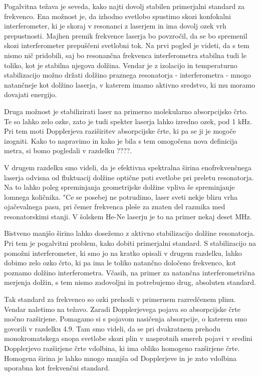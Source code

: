 Pogalvitna težava je seveda, kako najti dovolj stabilen primerjalni
standard za frekvenco. Ena možnost je, da izhodno svetlobo spustimo skozi
konfokalni interferometer, ki je skoraj v resonanci z laserjem in ima dovolj
ozek vrh prepustnosti. Majhen premik frekvence laserja bo povzročil, da se
bo spremenil skozi interferometer prepuščeni svetlobni tok. Na prvi pogled
je videti, da s tem nismo nič pridobili, saj bo resonančna frekvenca
interferometra stabilna tudi le toliko, kot je stabilna njegova dolžina.
Vendar je z izolacijo in temperaturno stabilizacijo možno držati dolžino
praznega resonatorja - interferometra - mnogo natančneje kot dolžino
laserja, v katerem imamo aktivno sredstvo, ki mu moramo dovajati energijo.

Druga možnost je stabilizirati laser na primerno molekularno absorpcijsko
črto. Te so lahko zelo ozke, zato je tudi spekter laserja lahko izredno
ozek, pod 1 kHz. Pri tem moti Dopplerjeva raziširitev absorpcijske črte,
ki pa se ji je mogoče izogniti. Kako to napravimo in kako je bila s tem
omogočena nova definicija metra, si bomo pogledali v razdelku ????.


V drugem razdelku smo videli, da je efektivna spektralna širina
eno\-frekvenčnega laserja odvisna od fluktuacij dolžine optične poti
svetlobe pri preletu resonatorja. Na to lahko poleg spreminjanja
geometrijske dolžine vpliva še spreminjanje lomnega količnika. "Ce se
posebej ne potrudimo, laser sveti nekje blizu vrha ojačevalnega pasu, pri
čemer frekvenca pleše za znaten del razmika med resonatorskimi stanji. V
šolskem He-Ne laserju je to na primer nekaj deset MHz.

Bistveno manjšo širino lahko dosežemo z aktivno stabilizacijo dolžine
resonatorja. Pri tem je pogalvitni problem, kako dobiti primerjalni
standard. S stabilizacijo na pomožni interferometer, ki smo jo na kratko
opisali v drugem razdelku, lahko dobimo zelo ozko črto, ki pa ima le toliko
natančno določeno frekvenco, kot poznamo dolžino interferometra. Včasih,
na primer za natančna interferometrična merjenja dolžin, s tem nismo
zadovoljni in potrebujemo drug, absoluten standard.

Tak standard za frekvenco so ozki prehodi v primernem razredčenem plinu.
Vendar naletimo na težavo. Zaradi Dopplerjevega pojava so absorpcijske
črte močno razširjene. Pomagamo si s pojavom nasičenja absorpcije, o katerem
smo govorili v razdelku 4.9. Tam smo videli, da se pri dvakratnem prehodu
monokromatskega snopa svetlobe skozi plin v nasprotnih smereh pojavi v
sredini Dopplerjevo razširjene črte vdolbina, ki ima obliko homogeno
razširjene črte. Homogena širina je lahko mnogo manjša od Dopplerjeve in
je zato vdolbina uporabna kot frekvenčni standard.

